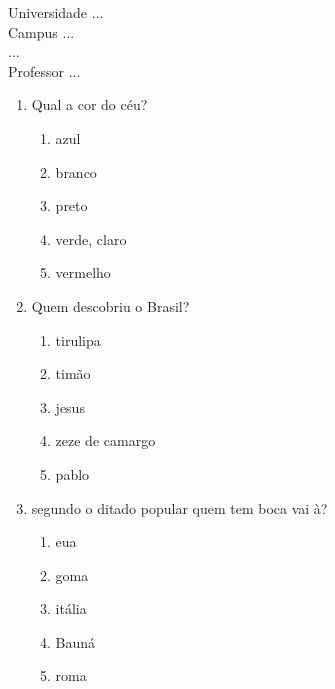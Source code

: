\documentclass[10pt,a4paper,twocolumn]{report}
\begin{document}
\begin{flushleft}
Universidade ...\\
Campus ...\\
...\\
Professor ...\\
\end{flushleft}




 \begin{enumerate} 
    \item  Qual a cor do céu?





    \begin{enumerate}
    \item  azul

\item  branco

\item  preto

\item  verde, claro

\item  vermelho


    \end{enumerate} 
    \item  Quem descobriu o Brasil?





    \begin{enumerate}
    \item  tirulipa

\item  timão

\item  jesus

\item  zeze de camargo

\item  pablo


    \end{enumerate} 
    \item  segundo o ditado popular quem tem boca vai à?





    \begin{enumerate}
    \item  eua

\item  goma

\item  itália

\item  Bauná

\item  roma


    \end{enumerate}\end{enumerate} 
\end{document}
